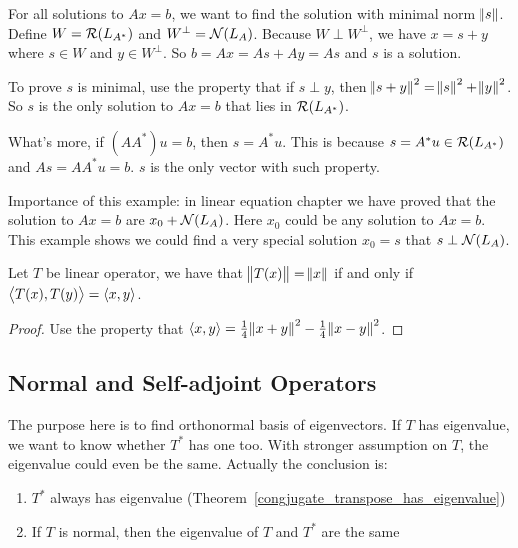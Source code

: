 \begin{example}
    For all solutions to $Ax=b$, we want to find the solution with minimal norm $\norm{s}$. Define $W = \mathcal{R}(L_{A^*})$ and $W^\perp = \mathcal{N}(L_A)$. Because $W \perp W^\perp$, we have $x = s + y$ where $s \in W$ and $y \in W^\perp$. So $b = Ax = As + Ay = As$ and $s$ is a solution.
    
    To prove $s$ is minimal, use the property that if $s \perp y$, then $\norm{s+y}^2 = \norm{s}^2 + \norm{y}^2$. So $s$ is the only solution to $Ax=b$ that lies in $\mathcal{R}(L_{A^*})$.
    
    What's more, if $(AA^*)u = b$, then $s = A^* u$. This is because $s = A^* u \in \mathcal{R}(L_{A^*})$ and $As = AA^*u = b$. $s$ is the only vector with such property.
    
    Importance of this example: in linear equation chapter we have proved that the solution to $Ax=b$ are $x_0 +  \mathcal{N}(L_A)$. Here $x_0$ could be any solution to $Ax=b$. This example shows we could find a very special solution $x_0 = s$ that $s \perp \mathcal{N}(L_A)$.
\end{example}



\begin{theorem}
    Let $T$ be linear operator, we have that $\norm{T(x)} = \norm{x}$ if and only if $\left\langle \displaystyle T(x), T(y) \right\rangle = \left\langle \displaystyle x, y \right\rangle$.
\end{theorem}
\begin{proof}
    Use the property that $\left\langle \displaystyle x, y \right\rangle = \frac{1}{4}\norm{x+y}^2 - \frac{1}{4}\norm{x-y}^2$.
\end{proof}



\subsection{Normal and Self-adjoint Operators}

The purpose here is to find orthonormal basis of eigenvectors. If $T$ has eigenvalue, we want to know whether $T^*$ has one too. With stronger assumption on $T$, the eigenvalue could even be the same. Actually the conclusion is:
\begin{enumerate}
    \item $T^*$ always has eigenvalue (Theorem~\ref{congjugate_transpose_has_eigenvalue})
    \item If $T$ is normal, then the eigenvalue of $T$ and $T^*$ are the same
\end{enumerate}

